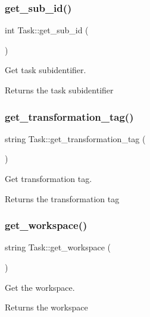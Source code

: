 \subsubsection{\texorpdfstring{get\+\_\+sub\+\_\+id()}{get\_sub\_id()}}
{\footnotesize\ttfamily int Task\+::get\+\_\+sub\+\_\+id (\begin{DoxyParamCaption}{ }\end{DoxyParamCaption})}

Get task subidentifier. \begin{DoxyReturn}{Returns}
the task subidentifier 
\end{DoxyReturn}
\mbox{\label{classTask_ac0821d83651e5702218f7cb414888915}} 
\subsubsection{\texorpdfstring{get\+\_\+transformation\+\_\+tag()}{get\_transformation\_tag()}}
{\footnotesize\ttfamily string Task\+::get\+\_\+transformation\+\_\+tag (\begin{DoxyParamCaption}{ }\end{DoxyParamCaption})}

Get transformation tag. \begin{DoxyReturn}{Returns}
the transformation tag 
\end{DoxyReturn}
\mbox{\label{classTask_a19596eec4c5c3d12b4bba38a66bf21c2}} 
\subsubsection{\texorpdfstring{get\+\_\+workspace()}{get\_workspace()}}
{\footnotesize\ttfamily string Task\+::get\+\_\+workspace (\begin{DoxyParamCaption}{ }\end{DoxyParamCaption})}

Get the workspace. \begin{DoxyReturn}{Returns}
the workspace 
\end{DoxyReturn}
\mbox{\label{classTask_ad84f8f6e846b853c5e6b35ba3f0c470f}} 
